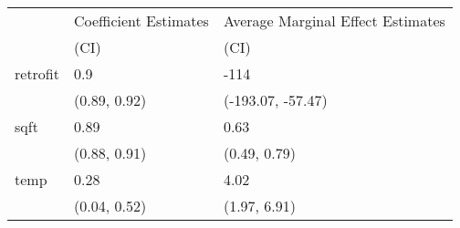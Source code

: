 \begin{tabular}{lll}
\toprule
{} & Coefficient Estimates & Average Marginal Effect Estimates \\
{} &                  (CI) &                              (CI) \\
\midrule
retrofit &                   0.9 &                              -114 \\
         &          (0.89, 0.92) &                 (-193.07, -57.47) \\
sqft     &                  0.89 &                              0.63 \\
         &          (0.88, 0.91) &                      (0.49, 0.79) \\
temp     &                  0.28 &                              4.02 \\
         &          (0.04, 0.52) &                      (1.97, 6.91) \\
\bottomrule
\end{tabular}
